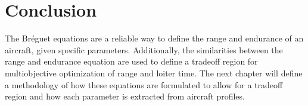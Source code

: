 \section{Conclusion}
The Br\'eguet equations are a reliable way to define the range and endurance of an aircraft, given specific parameters. Additionally, the similarities between the range and endurance equation are used to define a tradeoff region for multiobjective optimization of range and loiter time. The next chapter will define a methodology of how these equations are formulated to allow for a tradeoff region and how each parameter is extracted from aircraft profiles.